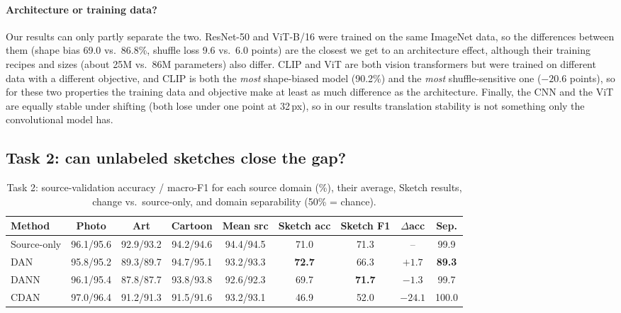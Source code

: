 \documentclass{article}
\begin{document}
\paragraph{Architecture or training data?} Our results can only partly separate the two. ResNet-50 and ViT-B/16 were trained on the same ImageNet data, so the differences between them (shape bias 69.0 vs.\ 86.8\%, shuffle loss 9.6 vs.\ 6.0 points) are the closest we get to an architecture effect, although their training recipes and sizes (about 25M vs.\ 86M parameters) also differ. CLIP and ViT are both vision transformers but were trained on different data with a different objective, and CLIP is both the \emph{most} shape-biased model (90.2\%) and the \emph{most} shuffle-sensitive one ($-20.6$ points), so for these two properties the training data and objective make at least as much difference as the architecture. Finally, the CNN and the ViT are equally stable under shifting (both lose under one point at 32\,px), so in our results translation stability is not something only the convolutional model has.

\subsection{Task 2: can unlabeled sketches close the gap?}

\begin{table}[t]
\centering\small
\caption{Task 2: source-validation accuracy / macro-F1 for each source domain (\%), their average, Sketch results, change vs.\ source-only, and domain separability (50\% = chance).}
\label{tab:t2}
\setlength{\tabcolsep}{3pt}
\begin{tabular}{l ccc c cc c c}
\toprule
Method & Photo & Art & Cartoon & Mean src & Sketch acc & Sketch F1 & $\Delta$acc & Sep.\\
\midrule
Source-only & 96.1/95.6 & 92.9/93.2 & 94.2/94.6 & 94.4/94.5 & 71.0 & 71.3 & -- & 99.9\\
DAN         & 95.8/95.2 & 89.3/89.7 & 94.7/95.1 & 93.2/93.3 & \textbf{72.7} & 66.3 & $+1.7$ & \textbf{89.3}\\
DANN & 96.1/95.4 & 87.8/87.7 & 93.8/93.8 & 92.6/92.3 & 69.7 & \textbf{71.7} & $-1.3$ & 99.7\\
CDAN & 97.0/96.4 & 91.2/91.3 & 91.5/91.6 & 93.2/93.1 & 46.9 & 52.0 & $-24.1$ & 100.0\\
\bottomrule
\end{tabular}
\end{table}
\end{document}
